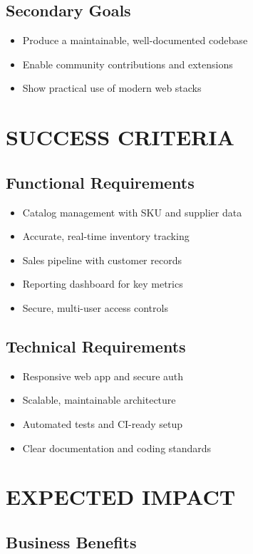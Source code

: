 \subsection{Secondary Goals}
\begin{itemize}
\item Produce a maintainable, well-documented codebase
\item Enable community contributions and extensions
\item Show practical use of modern web stacks
\end{itemize}

\section{SUCCESS CRITERIA}

\subsection{Functional Requirements}
\begin{itemize}
\item Catalog management with SKU and supplier data
\item Accurate, real-time inventory tracking
\item Sales pipeline with customer records
\item Reporting dashboard for key metrics
\item Secure, multi-user access controls
\end{itemize}

\subsection{Technical Requirements}
\begin{itemize}
\item Responsive web app and secure auth
\item Scalable, maintainable architecture
\item Automated tests and CI-ready setup
\item Clear documentation and coding standards
\end{itemize}

\section{EXPECTED IMPACT}

\subsection{Business Benefits}

